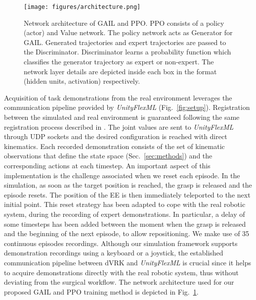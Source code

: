 \documentclass[letterpaper, 10 pt, conference]{ieeeconf}
\begin{document}
\begin{figure}[thpb]
	\centering
	\texttt{[image: figures/architecture.png]}
	\caption{Network architecture of GAIL and PPO. PPO consists of a policy (actor) and Value network. The policy network acts as Generator for GAIL. Generated trajectories and expert trajectories are passed to the Discriminator. Discriminator learns a probability function which classifies the generator trajectory as expert or non-expert. The network layer details are depicted inside each box in the format (hidden units, activation) respectively.} 
	\label{fig:gailarc}
\end{figure}

Acquisition of task demonstrations from the real environment leverages the communication pipeline provided by \textit{UnityFlexML} (Fig.~\ref{fig:setup}). Registration between the simulated and real environment is guaranteed following the same registration process described in \cite{tagliabue2020soft}.
The joint values are sent to \textit{UnityFlexML} through UDP sockets and the desired configuration is reached with direct kinematics. Each recorded demonstration consists of the set of kinematic observations that define the state space (Sec.~\ref{sec:methods}) and the corresponding actions at each timestep. An important aspect of this implementation is the challenge associated when we reset each episode. 
In the simulation, as soon as the target position is reached, the grasp is released and the episode resets.  The position of the EE is then immediately teleported to the next initial point. 
This reset strategy has been adapted to cope with the real robotic system, during the recording of expert demonstrations. In particular, a delay of some timesteps has been added between the moment when the grasp is released and the beginning of the next episode, to allow repositioning.
We make use of 35 continuous episodes recordings. 
Although our simulation framework supports demonstration recordings using a keyboard or a joystick, the established communication pipeline between dVRK and \textit{UnityFlexML} is crucial since it helps to acquire demonstrations directly with the real robotic system, thus without deviating from the surgical workflow.
The network architecture used for our proposed GAIL and PPO training method is depicted in Fig.~\ref{fig:gailarc}.
\end{document}
